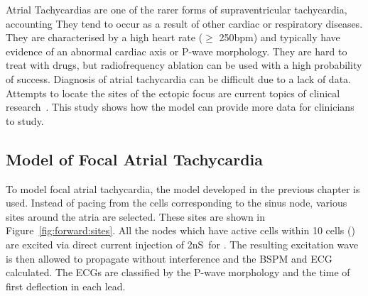Atrial Tachycardias are one of the rarer forms of supraventricular
tachycardia, accounting 
They tend to occur as a result of other cardiac or respiratory diseases.
They are characterised by a high heart rate ($\geq$ \unit{250}{bpm}) and
typically have evidence of an abnormal cardiac axis or P-wave morphology.
They are hard to treat with drugs, but radiofrequency ablation can be used with
a high probability of success.
Diagnosis of atrial tachycardia can be difficult due to a lack of data.
Attempts to locate the sites of the ectopic focus are current topics of clinical
research~\cite{Kistler2006,Kahn2006,Yamane2001}.
This study shows how the model can provide more data for clinicians to study.

\subsection{Model of Focal Atrial Tachycardia}

To model focal atrial tachycardia, the model developed in the previous chapter
is used.
Instead of pacing from the cells corresponding to the sinus node, various sites
around the atria are selected.
These sites are shown in Figure~\ref{fig:forward:sites}.
All the nodes which have active cells within 10 cells () are excited via
direct current injection of \unit{2}{nS}\ for .
The resulting excitation wave is then allowed to propagate without interference
and the BSPM and ECG calculated.
The ECGs are classified by the P-wave morphology and the time of first
deflection in each lead.



